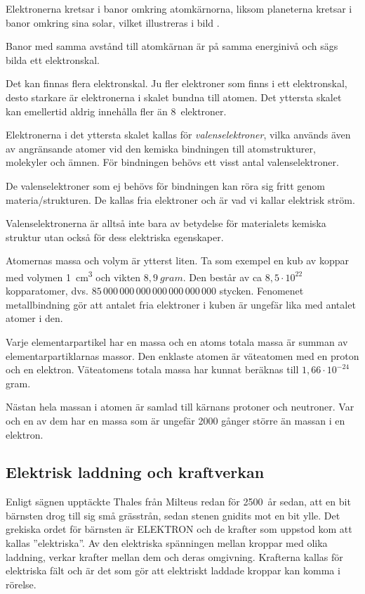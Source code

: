 
Elektronerna kretsar i banor omkring atomkärnorna, liksom
planeterna kretsar i banor omkring sina solar, vilket illustreras i bild
.

Banor med samma avstånd till atomkärnan är på samma energinivå och sägs bilda
ett elektronskal.

Det kan finnas flera elektronskal.
Ju fler elektroner som finns i ett elektronskal, desto starkare är elektronerna
i skalet bundna till atomen.
Det yttersta skalet kan emellertid aldrig innehålla fler än 8~elektroner.

Elektronerna i det yttersta skalet kallas för \emph{valenselektroner}, vilka
används även av angränsande atomer vid den kemiska bindningen till
atomstrukturer, molekyler och ämnen.
För bindningen behövs ett visst antal valenselektroner.

De valenselektroner som ej behövs för bindningen kan röra sig fritt genom
materia/strukturen.
De kallas fria elektroner och är vad vi kallar elektrisk ström.

Valenselektronerna är alltså inte bara av betydelse för materialets kemiska
struktur utan också för dess elektriska egenskaper.

Atomernas massa och volym är ytterst liten.
Ta som exempel en kub av koppar med volymen \qty{1}{\cubic\centi\metre} och
vikten \(8,9\ gram\).
Den består av ca \(8,5 \cdot 10^{22}\) kopparatomer, dvs.
\(85\, 000\, 000\, 000\, 000\, 000\, 000\, 000\) stycken.
Fenomenet metallbindning gör att antalet fria elektroner i kuben är ungefär lika
med antalet atomer i den.

Varje elementarpartikel har en massa och en atoms totala massa är summan av
elementarpartiklarnas massor.
Den enklaste atomen är väteatomen med en proton och en elektron.
Väteatomens totala massa har kunnat beräknas till \(1,66 \cdot 10^{-24}\) gram.

Nästan hela massan i atomen är samlad till kärnans protoner och neutroner.
Var och en av dem har en massa som är ungefär 2000 gånger större än massan i en
elektron.

\subsection{Elektrisk laddning och kraftverkan}

Enligt sägnen upptäckte Thales från Milteus redan för 2500~år sedan, att en bit
bärnsten drog till sig små grässtrån, sedan stenen gnidits mot en bit ylle.
Det grekiska ordet för bärnsten är ELEKTRON och de krafter som uppstod kom att
kallas ''elektriska''.
Av den elektriska spänningen mellan kroppar med olika laddning, verkar krafter
mellan dem och deras omgivning.
Krafterna kallas för elektriska fält och är det som gör att elektriskt laddade
kroppar kan komma i rörelse.

